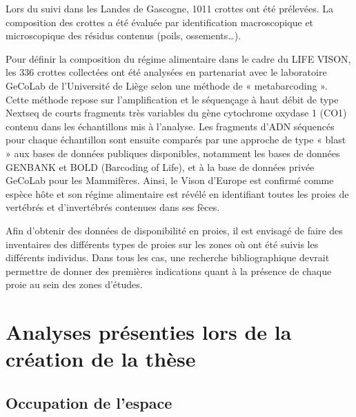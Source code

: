\documentclass[
  letterpaper,
  DIV=11,
  numbers=noendperiod]{scrreprt}
\begin{document}
Lors du suivi dans les Landes de Gascogne, 1011 crottes ont été
prélevées. La composition des crottes a été évaluée par identification
macroscopique et microscopique des résidus contenus (poils,
ossements\ldots).

Pour définir la composition du régime alimentaire dans le cadre du LIFE
VISON, les 336 crottes collectées ont été analysées en partenariat avec
le laboratoire GeCoLab de l'Université de Liège selon une méthode de «
metabarcoding ». Cette méthode repose sur l'amplification et le
séquençage à haut débit de type Nextseq de courts fragments très
variables du gène cytochrome oxydase 1 (CO1) contenu dans les
échantillons mis à l'analyse. Les fragments d'ADN séquencés pour chaque
échantillon sont ensuite comparés par une approche de type « blast » aux
bases de données publiques disponibles, notamment les bases de données
GENBANK et BOLD (Barcoding of Life), et à la base de données privée
GeCoLab pour les Mammifères. Ainsi, le Vison d'Europe est confirmé comme
espèce hôte et son régime alimentaire est révélé en identifiant toutes
les proies de vertébrés et d'invertébrés contenues dans ses fèces.

Afin d'obtenir des données de disponibilité en proies, il est envisagé
de faire des inventaires des différents types de proies sur les zones où
ont été suivis les différents individus. Dans tous les cas, une
recherche bibliographique devrait permettre de donner des premières
indications quant à la présence de chaque proie au sein des zones
d'études.

\chapter{Analyses présenties lors de la création de la
thèse}\label{analyses-pruxe9senties-lors-de-la-cruxe9ation-de-la-thuxe8se}

\section{Occupation de l'espace}\label{occupation-de-lespace}
\end{document}
